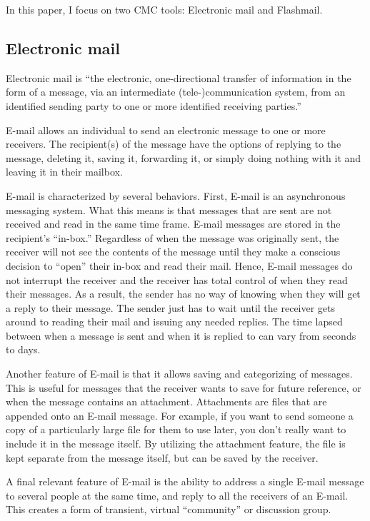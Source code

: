 In this paper, I focus on two CMC tools: Electronic mail and Flashmail.

\subsection{Electronic mail}
Electronic mail is ``the electronic, one-directional transfer of
information in the form of a message, via an intermediate
(tele-)communication system, from an identified sending party to one or
more identified receiving parties.''  \cite{Vervest85}

E-mail allows an individual to send an electronic message to one or more
receivers.  The recipient(s) of the message have the options of replying to
the message, deleting it, saving it, forwarding it, or simply doing nothing
with it and leaving it in their mailbox.

E-mail is characterized by several behaviors.  First, E-mail is an
asynchronous messaging system.  What this means is that messages that are
sent are not received and read in the same time frame. E-mail messages are
stored in the recipient's ``in-box.'' Regardless of when the message was
originally sent, the receiver will not see the contents of the message
until they make a conscious decision to ``open'' their in-box and read
their mail.  Hence, E-mail messages do not interrupt the receiver and the
receiver has total control of when they read their messages.  As a result,
the sender has no way of knowing when they will 
get a reply to their message. The sender just has to wait until the
receiver gets around to reading their mail and issuing any needed replies. The time
lapsed between when a message is sent and when it is replied to can vary
from seconds to days.

Another feature of E-mail is that it allows saving and categorizing of
messages.  This is useful for messages that the receiver wants to
save for future reference, or when the message contains an attachment.
Attachments are files that are appended onto
an E-mail message.  For example, if you want to send someone a copy of a
particularly large file for them to use later, you don't really want to
include it in the message itself.  By utilizing the attachment feature, the
file is kept separate from the message itself, but can be saved by the
receiver.

A final relevant feature of E-mail is the ability to
address a single E-mail message to several people at the same time, and
reply to all the receivers of an E-mail.  This creates a form of transient,
virtual ``community'' or discussion group.


